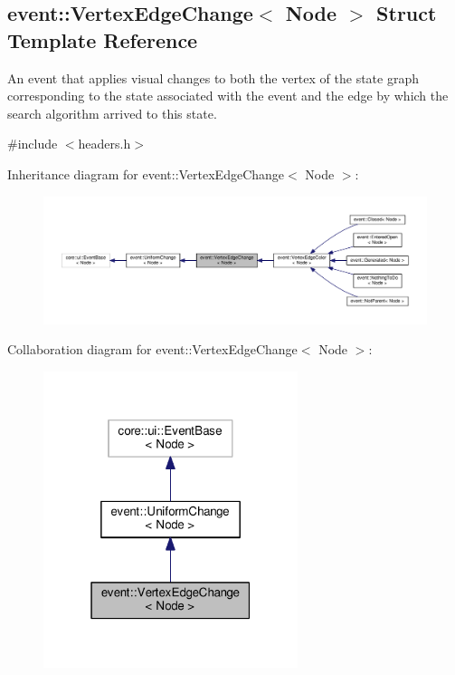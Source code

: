 \hypertarget{structevent_1_1VertexEdgeChange}{}\subsection{event\+:\+:Vertex\+Edge\+Change$<$ Node $>$ Struct Template Reference}
\label{structevent_1_1VertexEdgeChange}


An event that applies visual changes to both the vertex of the state graph corresponding to the state associated with the event and the edge by which the search algorithm arrived to this state.  




{\ttfamily \#include $<$headers.\+h$>$}



Inheritance diagram for event\+:\+:Vertex\+Edge\+Change$<$ Node $>$\+:\nopagebreak
\begin{figure}[H]
\begin{center}
\leavevmode
\includegraphics[width=350pt]{structevent_1_1VertexEdgeChange__inherit__graph}
\end{center}
\end{figure}


Collaboration diagram for event\+:\+:Vertex\+Edge\+Change$<$ Node $>$\+:\nopagebreak
\begin{figure}[H]
\begin{center}
\leavevmode
\includegraphics[width=211pt]{structevent_1_1VertexEdgeChange__coll__graph}
\end{center}
\end{figure}
